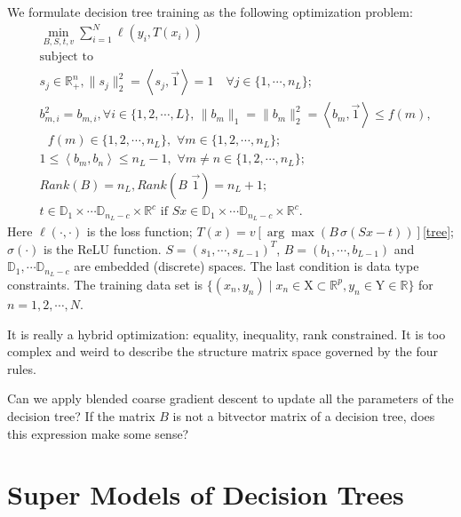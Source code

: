 \documentclass[UTF8]{article}
\begin{document}
We formulate decision tree training as the following optimization problem:
\begin{equation}
\begin{aligned}\label{equa5}
&\min_{B, S, t,v}\sum_{i=1}^{N}\ell(y_i, T(x_i))\\
&\text{subject to}\\
&\text{$s_j\in\mathbb{R}_{+}^{n},\|s_j\|_{2}^2=\left<s_j, \vec{1}\right>=1\quad \forall j\in\{1,\cdots,n_L\}$;}\\
&\text{$b_{m,i}^2=b_{m,i},\forall i\in\{1,2,\cdots,L\}$, $\|b_m\|_1=\|b_m\|_2^2=\left<b_m, \vec{1}\right>\leq f(m)$},\\
&\text{ $f(m)\in\{1,2,\cdots,n_L\},\,\,\forall m\in\{1,2,\cdots,n_L\}$;}\\
&\text{$1\leq\left<b_m,b_n\right>\leq n_L -1,\,\,\forall m\not=n\in\{1,2,\cdots,n_L\};$ }\\
&\text{$Rank(B)=n_L, Rank(B\,\,\vec 1)=n_L+1$;}\\
&\text{$t\in\mathbb{D}_1\times\cdots\mathbb{D}_{n_L-c}\times\mathbb{R}^{c}$ if $Sx\in\mathbb{D}_1\times\cdots\mathbb{D}_{n_L-c}\times\mathbb{R}^{c}$.}
\end{aligned}
\end{equation}
Here $\ell(\cdot,\cdot)$ is the loss function;
$T(x)=v[\arg\max(B\,\sigma(Sx-t))]$\eqref{tree};
$\sigma(\cdot)$ is the ReLU function.
$S=(s_1,\cdots,s_{L-1})^T$, $B=(b_1,\cdots, b_{L-1})$
and $\mathbb{D}_1,\cdots\mathbb{D}_{n_L-c}$ are embedded (discrete) spaces.
The last condition is data type constraints.
The training data set is $\{(x_n, y_n)\mid x_n\in\mathrm{X}\subset\mathbb{R}^{p}, y_n\in\mathrm{Y}\in\mathbb R\}$ for $n=1,2,\cdots, N$.

It is really a hybrid optimization: equality, inequality, rank constrained.
It is too complex and weird to describe the structure matrix space governed by the four rules.

Can we apply blended coarse gradient descent to update all the parameters of the decision tree?
If the matrix $B$ is not a bitvector matrix of a decision tree,
does this expression make some sense?

\section{Super Models of Decision Trees}
\end{document}
